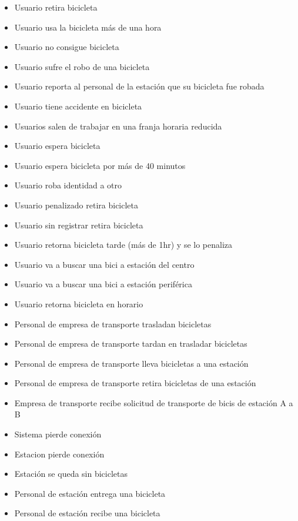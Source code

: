 \documentclass[a4paper, 10pt, twoside]{article}
\begin{document}
\begin{multicols}{2}
  \begin{itemize}
    \item Usuario retira bicicleta	
    \item Usuario usa la bicicleta más de una hora
    \item Usuario no consigue bicicleta
    \item Usuario sufre el robo de una bicicleta
    \item Usuario reporta al personal de la estación que su bicicleta fue robada	
    \item Usuario tiene accidente en bicicleta
    \item Usuarios salen de trabajar en una franja horaria reducida	
    \item Usuario espera bicicleta
    \item Usuario espera bicicleta por más de 40 minutos 
    \item Usuario roba identidad a otro
    \item Usuario penalizado retira bicicleta	
    \item Usuario sin registrar retira bicicleta
    \item Usuario retorna bicicleta tarde (más de 1hr) y se lo penaliza
    \item Usuario va a buscar una bici a estación del centro
    \item Usuario va a buscar una bici a estación periférica
    \item Usuario retorna bicicleta en horario 
    \item Personal de empresa de transporte trasladan bicicletas
    \item Personal de empresa de transporte tardan en trasladar bicicletas
    \item Personal de empresa de transporte lleva bicicletas a una estación
    \item Personal de empresa de transporte retira bicicletas de una estación
    \item Empresa de transporte recibe solicitud de transporte de bicis de estación A a B 
    \item Sistema pierde conexión
    \item Estacion pierde conexión
    \item Estación se queda sin bicicletas
    \item Personal de estación entrega una bicicleta 
    \item Personal de estación recibe una bicicleta

\end{itemize}
\end{multicols}
\end{document}
